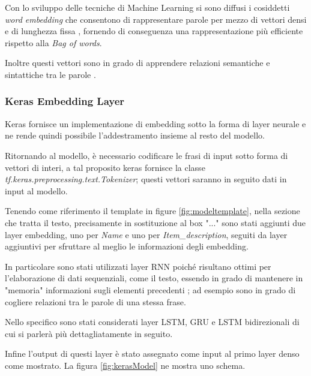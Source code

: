 Con lo sviluppo delle tecniche di Machine Learning si sono diffusi i cosiddetti
\textit{word embedding} che consentono di rappresentare parole per mezzo di
vettori densi e di lunghezza fissa \cite{almeida2019word}, fornendo di
conseguenza una rappresentazione più efficiente rispetto alla \textit{Bag of
words}.

Inoltre questi vettori sono in grado di apprendere relazioni semantiche e
sintattiche tra le parole \cite{mikolov2013efficient}.

\subsubsection{Keras Embedding Layer}

Keras fornisce un implementazione di embedding sotto la forma di layer neurale e
ne rende quindi possibile l'addestramento insieme al resto del modello.


Ritornando al modello, è necessario codificare le frasi di input sotto forma di
vettori di interi, a tal proposito keras fornisce la classe
\textit{tf.keras.preprocessing.\-text.Tokenizer}; questi vettori saranno in
seguito dati in input al modello.

Tenendo come riferimento il template in figure
\ref{fig:modeltemplate}, nella sezione che tratta il testo, precisamente in
sostituzione al box "..." sono stati aggiunti due layer embedding, uno per
\textit{Name} e uno per \textit{Item\_description}, seguiti da layer aggiuntivi
per sfruttare al meglio le informazioni degli embedding.

In particolare sono stati utilizzati layer RNN poiché risultano ottimi per
l'elaborazione di dati sequenziali, come il testo, essendo in grado di mantenere
in "memoria" informazioni sugli elementi precedenti \cite{liang2017text}; ad
esempio sono in grado di cogliere relazioni tra le parole di una stessa frase.

Nello specifico sono stati considerati layer LSTM, GRU e LSTM bidirezionali di
cui si parlerà più dettagliatamente in seguito.

Infine l'output di questi layer è stato assegnato come input al primo layer
denso come mostrato. La figura \ref{fig:kerasModel} ne mostra uno schema.



